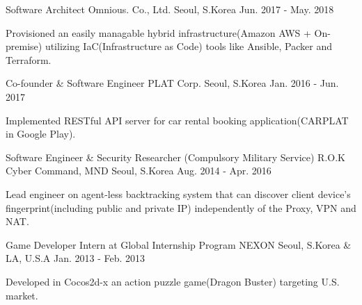 

\begin{cventries}

  \cventry
    {Software Architect} %
    {Omnious. Co., Ltd.} %
    {Seoul, S.Korea} %
    {Jun. 2017 - May. 2018} %
    {
      \begin{cvitems} %
        \item {Provisioned an easily managable hybrid infrastructure(Amazon AWS + On-premise) utilizing IaC(Infrastructure as Code) tools like Ansible, Packer and Terraform.}
      \end{cvitems}
    }

  \cventry
    {Co-founder \& Software Engineer} %
    {PLAT Corp.} %
    {Seoul, S.Korea} %
    {Jan. 2016 - Jun. 2017} %
    {
      \begin{cvitems} %
        \item {Implemented RESTful API server for car rental booking application(CARPLAT in Google Play).}
      \end{cvitems}
    }

  \cventry
    {Software Engineer \& Security Researcher (Compulsory Military Service)} %
    {R.O.K Cyber Command, MND} %
    {Seoul, S.Korea} %
    {Aug. 2014 - Apr. 2016} %
    {
      \begin{cvitems} %
        \item {Lead engineer on agent-less backtracking system that can discover client device's fingerprint(including public and private IP) independently of the Proxy, VPN and NAT.}
      \end{cvitems}
    }

  \cventry
    {Game Developer Intern at Global Internship Program} %
    {NEXON} %
    {Seoul, S.Korea \& LA, U.S.A} %
    {Jan. 2013 - Feb. 2013} %
    {
      \begin{cvitems} %
        \item {Developed in Cocos2d-x an action puzzle game(Dragon Buster) targeting U.S. market.}
      \end{cvitems}
    }


\end{cventries}
